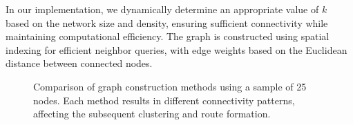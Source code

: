 In our implementation, we dynamically determine an appropriate value of $k$ based on the network size and density, ensuring sufficient connectivity while maintaining computational efficiency. The graph is constructed using spatial indexing for efficient neighbor queries, with edge weights based on the Euclidean distance between connected nodes.

\begin{figure}[!htbp]
\centerline{
}
\centerline{
}
\caption{Comparison of graph construction methods using a sample of 25 nodes. Each method results in different connectivity patterns, affecting the subsequent clustering and route formation.}
\label{fig:graph_examples}
\end{figure}

